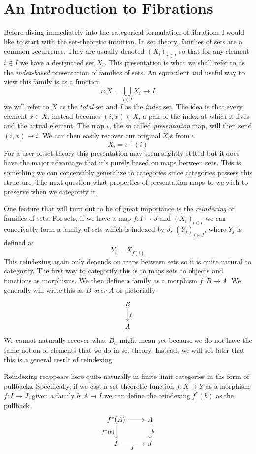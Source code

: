 
\section{An Introduction to Fibrations}

Before diving immediately into the categorical formulation of
fibrations I would like to start with the set-theoretic intuition. In
set theory, families of sets are a common occurrence. They are usually
denoted $(X_i)_{i \in I}$ so that for any element $i \in I$ we have a
designated set $X_i$. This presentation is what we shall refer to as
the \emph{index-based} presentation of families of sets. An equivalent
and useful way to view this family is as a function
\[
  \iota : X = \bigcup_{i \in I} X_i \to I
\]
we will refer to $X$ as the \emph{total} set and $I$ as the
\emph{index} set. The idea is that every element $x \in X_i$ instead
becomes $(i, x) \in X$, a pair of the index at which it lives and the
actual element. The map $\iota$, the so called \emph{presentation}
map, will then send $(i, x) \mapsto i$. We can then easily recover our
original $X_i$s from $\iota$.
\[
  X_i = \iota^{-1}(i)
\]
For a user of set theory this presentation may seem slightly stilted
but it does have the major advantage that it's purely based on maps
between sets. This is something we can conceivably generalize to
categories since categories possess this structure. The next question
what properties of presentation maps to we wish to preserve when we
categorify it.

One feature that will turn out to be of great importance is the
\emph{reindexing} of families of sets. For sets, if we have a map
$f : I \to J$ and $(X_i)_{i \in I}$ we can conceivably form a
family of sets which is indexed by $J$, $(Y_j)_{j \in J}$, where $Y_j$
is defined as
\[
  Y_i = X_{f(i)}
\]
This reindexing again only depends on maps between sets so it is quite
natural to categorify. The first way to categorify this is to maps
sets to objects and functions as morphisms. We then define a family as
a morphism $f : B \to A$. We generally will write this as \emph{$B$
  over $A$} or pictorially
\[
  \begin{tikzcd}
    B \ar[d, "f"] \\
    A
  \end{tikzcd}
\]
We cannot naturally recover what $B_a$ might mean yet because we do
not have the same notion of elements that we do in set
theory. Instead, we will see later that this is a general result of
reindexing.

Reindexing reappears here quite naturally in finite limit categories
in the form of pullbacks. Specifically, if we cast a set theoretic
function $f : X \to Y$ as a morphism $f : I \to J$, given a family
$b : A \to I$ we can define the reindexing $f^*(b)$ as the pullback
\[
  \begin{tikzcd}
    f^*(A) \ar[d, swap, "f^*(b)"] \ar[r] & A \ar[d, "b"]\\
    I \ar[r, "f", swap] & J
  \end{tikzcd}
\]

